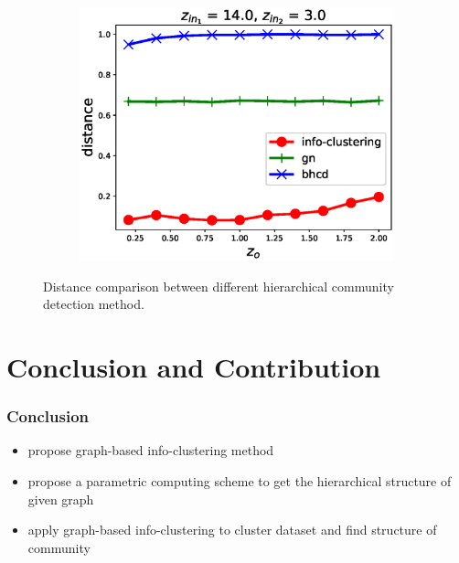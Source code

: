 \documentclass[notheorems]{beamer}
\begin{document}
\begin{frame}
\begin{figure}
\begin{subfigure}{0.33\textwidth}
		\caption{}
	\end{subfigure}~
	\begin{subfigure}{0.33\textwidth}
		\includegraphics[width=\textwidth]{pic/z_o.eps}
		\caption{}
	\end{subfigure}
	\caption{{\scriptsize Distance comparison between different hierarchical community detection method.}}\label{fig:cdr}	
\end{figure}    
\end{frame}
\section{Conclusion and Contribution}
\begin{frame}
\frametitle{Conclusion}
\begin{itemize}
\item propose graph-based info-clustering method
\item propose a parametric computing scheme to get the hierarchical structure of given graph 
\item apply graph-based info-clustering to cluster dataset and find structure of community
\end{itemize}
\end{frame}
\end{document}
